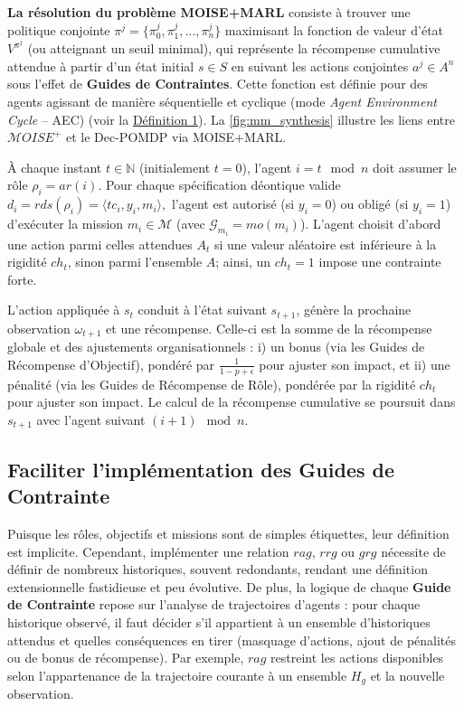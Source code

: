 \documentclass[francais,ROIA,Unicode,manuscript]{cedram}
\begin{document}
\textbf{La résolution du problème MOISE+MARL} consiste à trouver une politique conjointe
$
    \pi^j = \{\pi^j_0, \pi^j_1, \dots, \pi^j_n\}
$
maximisant la fonction de valeur d'état \(V^{\pi^j}\) (ou atteignant un seuil minimal), qui représente la récompense cumulative attendue à partir d'un état initial \(s \in S\) en suivant les actions conjointes \(a^j \in A^n\) sous l'effet de \textbf{Guides de Contraintes}. Cette fonction est définie pour des agents agissant de manière séquentielle et cyclique (mode \textit{Agent Environment Cycle} -- AEC) (voir la \hyperref[eq:single_value_function]{Définition 1}). La \autoref{fig:mm_synthesis} illustre les liens entre \(\mathcal{M}OISE^+\) et le Dec-POMDP via MOISE+MARL.

À chaque instant \(t \in \mathbb{N}\) (initialement \(t=0\)), l'agent \(i = t \mod n\) doit assumer le rôle \(\rho_i = ar(i)\). Pour chaque spécification déontique valide
$
    d_i = rds(\rho_i) = \langle tc_i, y_i, m_i \rangle,
$
l'agent est autorisé (si \(y_i=0\)) ou obligé (si \(y_i=1\)) d'exécuter la mission \(m_i \in \mathcal{M}\) (avec \(\mathcal{G}_{m_i} = mo(m_i)\)). L'agent choisit d'abord une action parmi celles attendues \(A_t\) si une valeur aléatoire est inférieure à la rigidité \(ch_t\), sinon parmi l'ensemble \(A\); ainsi, un \(ch_t = 1\) impose une contrainte forte.

L'action appliquée à \(s_t\) conduit à l'état suivant \(s_{t+1}\), génère la prochaine observation \(\omega_{t+1}\) et une récompense. Celle-ci est la somme de la récompense globale et des ajustements organisationnels :
i) un bonus (via les Guides de Récompense d'Objectif), pondéré par \(\frac{1}{1-p+\epsilon}\) pour ajuster son impact, et
ii) une pénalité (via les Guides de Récompense de Rôle), pondérée par la rigidité \(ch_t\) pour ajuster son impact.
Le calcul de la récompense cumulative se poursuit dans \(s_{t+1}\) avec l'agent suivant \((i+1) \mod n\).

\subsection{Faciliter l'implémentation des \textbf{Guides de Contrainte}}

Puisque les rôles, objectifs et missions sont de simples étiquettes, leur définition est implicite. Cependant, implémenter une relation \(rag\), \(rrg\) ou \(grg\) nécessite de définir de nombreux historiques, souvent redondants, rendant une définition extensionnelle fastidieuse et peu évolutive. De plus, la logique de chaque \textbf{Guide de Contrainte} repose sur l’analyse de trajectoires d’agents : pour chaque historique observé, il faut décider s’il appartient à un ensemble d’historiques attendus et quelles conséquences en tirer (masquage d’actions, ajout de pénalités ou de bonus de récompense). Par exemple, \(rag\) restreint les actions disponibles selon l’appartenance de la trajectoire courante à un ensemble \(H_g\) et la nouvelle observation.
\end{document}
